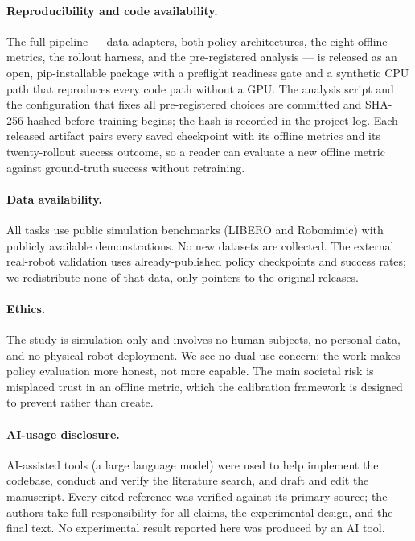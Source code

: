
\paragraph{Reproducibility and code availability.} The full pipeline --- data adapters, both
policy architectures, the eight offline metrics, the rollout harness, and the pre-registered
analysis --- is released as an open, pip-installable package with a preflight readiness gate
and a synthetic CPU path that reproduces every code path without a GPU. The analysis script and
the configuration that fixes all pre-registered choices are committed and SHA-256-hashed before
training begins; the hash is recorded in the project log. Each released artifact pairs every
saved checkpoint with its offline metrics and its twenty-rollout success outcome, so a reader
can evaluate a new offline metric against ground-truth success without retraining.

\paragraph{Data availability.} All tasks use public simulation benchmarks (LIBERO and
Robomimic) with publicly available demonstrations. No new datasets are collected. The external
real-robot validation uses already-published policy checkpoints and success rates; we
redistribute none of that data, only pointers to the original releases.

\paragraph{Ethics.} The study is simulation-only and involves no human subjects, no personal
data, and no physical robot deployment. We see no dual-use concern: the work makes policy
evaluation more honest, not more capable. The main societal risk is misplaced trust in an
offline metric, which the calibration framework is designed to prevent rather than create.

\paragraph{AI-usage disclosure.} AI-assisted tools (a large language model) were used to help
implement the codebase, conduct and verify the literature search, and draft and edit the
manuscript. Every cited reference was verified against its primary source; the authors take
full responsibility for all claims, the experimental design, and the final text. No
experimental result reported here was produced by an AI tool.

